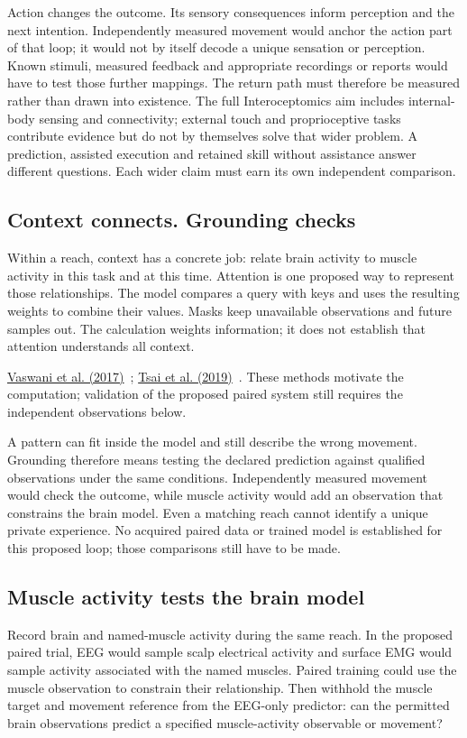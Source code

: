 Action changes the outcome. Its sensory consequences inform perception and
the next intention. Independently measured movement would anchor the action
part of that loop; it would not by itself decode a unique sensation or
perception. Known stimuli, measured feedback and appropriate recordings or
reports would have to test those further mappings. The return path must
therefore be measured rather than drawn into existence. The full
Interoceptomics aim includes internal-body sensing and connectivity; external
touch and proprioceptive tasks contribute evidence but do not by themselves
solve that wider problem. A prediction, assisted execution and retained skill
without assistance answer different questions. Each wider claim must earn
its own independent comparison.

\subsection{Context connects. Grounding checks}
Within a reach, context has a concrete job: relate brain activity to muscle
activity in this task and at this time. Attention is one proposed way to
represent those relationships. The model compares a query with keys and uses the resulting weights to combine their values. Masks keep unavailable observations and future
samples out. The calculation weights information; it does not establish that
attention understands all context.
\par\noindent \href{https://arxiv.org/html/1706.03762v7}{Vaswani et al. (2017)}~\cite{vaswani2017}; \href{https://aclanthology.org/P19-1656/}{Tsai et al. (2019)}~\cite{tsai2019}. These methods motivate the computation; validation of the proposed paired system still requires the independent observations below.

A pattern can fit inside the model and still describe the wrong movement.
Grounding therefore means testing the declared prediction against qualified
observations under the same conditions. Independently measured movement would
check the outcome, while muscle activity would add an observation that
constrains the brain model. Even a matching reach cannot identify a unique
private experience. No acquired paired data or trained model is established
for this proposed loop; those comparisons still have to be made.

\subsection{Muscle activity tests the brain model}
Record brain and named-muscle activity during the same reach. In the proposed
paired trial, EEG would sample scalp electrical activity and surface EMG would
sample activity associated with the named muscles. Paired training could use
the muscle observation to constrain their relationship. Then withhold the
muscle target and movement reference from the EEG-only predictor: can the
permitted brain observations predict a specified muscle-activity observable
or movement?

